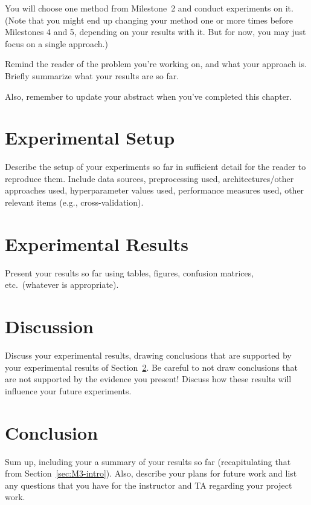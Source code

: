 \documentclass{report}
\begin{document}
You will choose one method from Milestone~2 and conduct experiments on it.  (Note that you might end up changing your method one or more times before Milestones 4 and 5, depending on your results with it. But for now, you may just focus on a single approach.)

Remind the reader of the problem you're working on, and what your approach is.  Briefly summarize what your results are so far.

Also, remember to update your abstract when you've completed this chapter.

\section{Experimental Setup}
\label{sec:M3-setup}

Describe the setup of your experiments so far in sufficient detail for the reader to reproduce them.  Include data sources, preprocessing used, architectures/other approaches used, hyperparameter values used, performance measures used, other relevant items (e.g., cross-validation).

\section{Experimental Results}
\label{sec:M3-results}

Present your results so far using tables, figures, confusion matrices, etc.\ (whatever is appropriate). 

\section{Discussion}

Discuss your experimental results, drawing conclusions that are supported by your experimental results of Section~\ref{sec:M3-results}.  Be careful to not draw conclusions that are not supported by the evidence you present! Discuss how these results will influence your future experiments.

\section{Conclusion}

Sum up, including your a summary of your results so far (recapitulating that from Section~\ref{sec:M3-intro}).  Also, describe your plans for future work and list any questions that you have for the instructor and TA regarding your project work.
\end{document}
